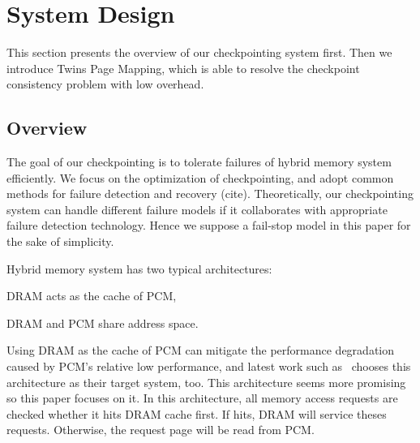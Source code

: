 \documentclass[conference]{IEEEtran}
\begin{document}

\section{System Design}\label{sec:design}

This section presents the overview of our checkpointing system first.
Then we introduce Twins Page Mapping, which is able to resolve the checkpoint consistency problem with low overhead.

\subsection{Overview}

The goal of our checkpointing is to tolerate failures of hybrid memory system efficiently.
We focus on the optimization of checkpointing, and adopt common methods for failure detection and recovery (cite).
Theoretically, our checkpointing system can handle different failure models if it collaborates with appropriate failure detection technology.
Hence we suppose a fail-stop model in this paper for the sake of simplicity.

Hybrid memory system has two typical architectures:
\begin{enumerate*}
\item DRAM acts as the cache of PCM,
\item DRAM and PCM share address space.
\end{enumerate*}
Using DRAM as the cache of PCM can mitigate the performance degradation caused by PCM's relative low performance, and latest work such as~\cite{qureshi_scalable_2009, qureshi_morphable_2010, park_power_2011, yoon_row_2012, ham_disintegrated_2013, zhou_leveraging_2013} chooses this architecture as their target system, too.
This architecture seems more promising so this paper focuses on it.
In this architecture, all memory access requests are checked whether it hits DRAM cache first.
If hits, DRAM will service theses requests.
Otherwise, the request page will be read from PCM\@.
\end{document}
